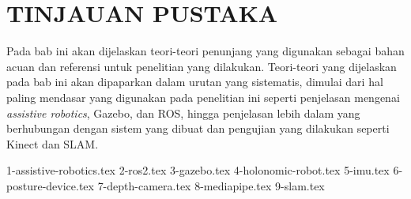 \chapter{TINJAUAN PUSTAKA}
\label{chap:tinjauanpustaka}

Pada bab ini akan dijelaskan teori-teori penunjang yang digunakan sebagai bahan acuan dan referensi untuk penelitian yang dilakukan.
Teori-teori yang dijelaskan pada bab ini akan dipaparkan dalam urutan yang sistematis,
  dimulai dari hal paling mendasar yang digunakan pada penelitian ini seperti penjelasan mengenai \emph{assistive robotics}, Gazebo, dan ROS,
  hingga penjelasan lebih dalam yang berhubungan dengan sistem yang dibuat dan pengujian yang dilakukan seperti Kinect dan SLAM.

{1-assistive-robotics.tex}
{2-ros2.tex}
{3-gazebo.tex}
{4-holonomic-robot.tex}
{5-imu.tex}
{6-posture-device.tex}
{7-depth-camera.tex}
{8-mediapipe.tex}
{9-slam.tex}
